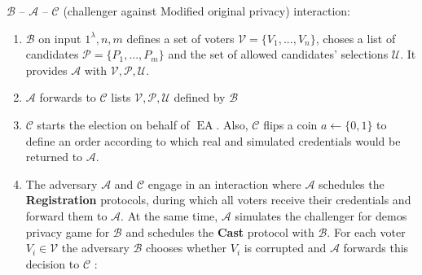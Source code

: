 \documentclass[12pt]{article}
\DeclareMathOperator{\ea}{EA}
\DeclareMathOperator{\bb}{BB}
\begin{document}
$\mathcal{B}$ -- $\mathcal{A}$ -- $\mathcal{C}$ (challenger against Modified original privacy) interaction: 
\begin{enumerate}
\item $\mathcal{B}$ on input $1^{\lambda},n,m$ defines a set of voters  $\mathcal{V} = \{V_1,...,V_n\}$, choses a list of candidates  $\mathcal{P} = \{P_1,...,P_m\}$ and the set of allowed candidates' selections $\mathcal{U}$.  It provides $\mathcal{A}$ with $\mathcal{V}, \mathcal{P}, \mathcal{U}$.
 \item $\mathcal{A}$ forwards to $\mathcal{C}$  lists $\mathcal{V}, \mathcal{P}, \mathcal{U}$ defined by $\mathcal{B}$
 \item  $\mathcal{C}$ starts the election on behalf of $\ea$. Also, $\mathcal{C}$ flips a coin $a \leftarrow \{0,1\}$ to define an order according to which real and simulated credentials would be returned to $\mathcal{A}$. 
 \item The adversary $\mathcal{A}$  and $\mathcal{C}$ engage in an interaction where $\mathcal{A}$ schedules the \textbf{Registration} protocols, during which all voters receive their credentials and forward them to $\mathcal{A}$. At the same time, $\mathcal{A}$ simulates the challenger for demos privacy game for $\mathcal{B}$ and schedules the  \textbf{Cast}  protocol with $\mathcal{B}$. For each voter  $V_i \in \mathcal{V}$ the adversary $\mathcal{B}$  chooses whether $V_i$ is corrupted and $\mathcal{A}$ forwards this decision to $\mathcal{C}$ :
\end{enumerate}
\end{document}
